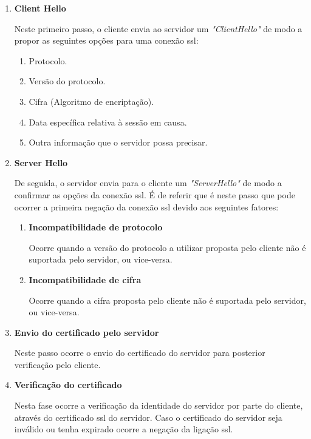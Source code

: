 \begin{enumerate}
    \item \textbf{Client Hello}
    
    Neste primeiro passo, o cliente envia ao servidor um \emph{"ClientHello"} de modo a propor as seguintes opções para uma conexão \gls{ssl}:
    
    \begin{enumerate}
        \item Protocolo.
        \item Versão do protocolo.
        \item Cifra (Algoritmo de encriptação).
        \item Data específica relativa à sessão em causa.
        \item Outra informação que o servidor possa precisar.
    \end{enumerate}
    
    \item \textbf{Server Hello}
    
    De seguida, o servidor envia para o cliente um \textit{"ServerHello"} de modo a confirmar as opções da conexão \gls{ssl}. É de referir que é neste passo que pode ocorrer a primeira negação da conexão \gls{ssl} devido aos seguintes fatores:
    
    \begin{enumerate}
        \item \textbf{Incompatibilidade de protocolo}
        
        Ocorre quando a versão do protocolo a utilizar proposta pelo cliente não é suportada pelo servidor, ou vice-versa.
        
        \item \textbf{Incompatibilidade de cifra}
        
        Ocorre quando a cifra proposta pelo cliente não é suportada pelo servidor, ou vice-versa.
    \end{enumerate}
    
    \item \textbf{Envio do certificado pelo servidor}
    
    Neste passo ocorre o envio do certificado do servidor para posterior verificação pelo cliente.
    
    \item \textbf{Verificação do certificado}
    
    Nesta fase ocorre a verificação da identidade do servidor por parte do cliente, através do certificado \gls{ssl} do servidor. Caso o certificado do servidor seja inválido ou tenha expirado ocorre a negação da ligação \gls{ssl}.
    

\end{enumerate}

